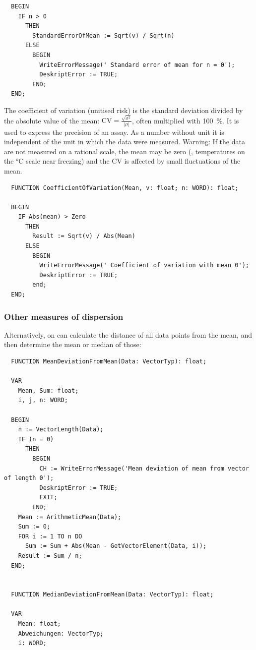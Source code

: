 \begin{refsection}
\begin{lstlisting}
  BEGIN
    IF n > 0
      THEN
        StandardErrorOfMean := Sqrt(v) / Sqrt(n)
      ELSE
        BEGIN
          WriteErrorMessage(' Standard error of mean for n = 0');
          DeskriptError := TRUE;
        END;
  END;
\end{lstlisting}



The coefficient of variation (unitised risk) is the standard deviation divided by the absolute value of the mean: \( \mathrm{CV} = \frac{\sqrt{\sigma^2}}{|\mu|} \), often multiplied with \SI{100}{\%}. It is used to express the precision of an assay. As a number without unit it is independent of the unit in which the data were measured. Warning: If the data are not measured on a rational scale, the mean may be zero (, temperatures on the \si{\celsius} scale near freezing) and the CV is affected by small fluctuations of the mean.
\begin{lstlisting}
  FUNCTION CoefficientOfVariation(Mean, v: float; n: WORD): float;

  BEGIN
    IF Abs(mean) > Zero
      THEN
        Result := Sqrt(v) / Abs(Mean)
      ELSE
        BEGIN
          WriteErrorMessage(' Coefficient of variation with mean 0');
          DeskriptError := TRUE;
        end;
  END;
\end{lstlisting}

\subsubsection{Other measures of dispersion}

Alternatively, on can calculate the distance of all data points from the mean, and then determine the mean or median of those:
\begin{lstlisting}
  FUNCTION MeanDeviationFromMean(Data: VectorTyp): float;

  VAR
    Mean, Sum: float;
    i, j, n: WORD;

  BEGIN
    n := VectorLength(Data);
    IF (n = 0)
      THEN
        BEGIN
          CH := WriteErrorMessage('Mean deviation of mean from vector of length 0');
          DeskriptError := TRUE;
          EXIT;
        END;
    Mean := ArithmeticMean(Data);
    Sum := 0;
    FOR i := 1 TO n DO
      Sum := Sum + Abs(Mean - GetVectorElement(Data, i));
    Result := Sum / n;
  END;


  FUNCTION MedianDeviationFromMean(Data: VectorTyp): float;

  VAR
    Mean: float;
    Abweichungen: VectorTyp;
    i: WORD;


\end{lstlisting}
\end{refsection}
